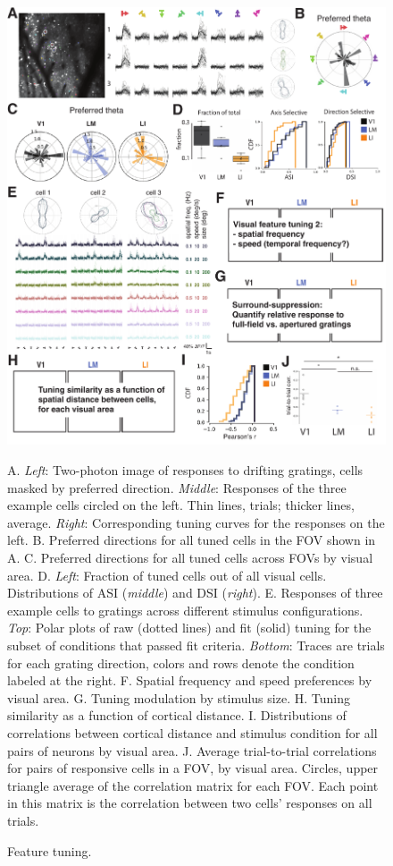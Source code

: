 \documentclass{article}
\begin{document}
\begin{figure}[ht]
  \includegraphics[width=\textwidth]{figures/features.pdf}
  \caption{Feature tuning.}
  \medskip
  \small
  A.  \textit{Left}:  Two-photon image of responses to drifting gratings, cells masked by preferred direction. \textit{Middle}: Responses of the three example cells circled on the left. Thin lines, trials; thicker lines, average. \textit{Right}:  Corresponding tuning curves for the responses on the left. 
  B.  Preferred directions for all tuned cells in the FOV shown in A.
  C.  Preferred directions for all tuned cells across FOVs by visual area.
  D.  \textit{Left}: Fraction of tuned cells out of all visual cells. Distributions of ASI (\textit{middle}) and DSI (\textit{right}).
  E.  Responses of three example cells to gratings across different stimulus configurations. \textit{Top}: Polar plots of raw (dotted lines) and fit (solid) tuning for the subset of conditions that passed fit criteria. \textit{Bottom}: Traces are trials for each grating direction, colors and rows denote the condition labeled at the right.
  F.  Spatial frequency and speed preferences by visual area.
  G.  Tuning modulation by stimulus size.
  H.  Tuning similarity as a function of cortical distance.
  I.  Distributions of correlations between cortical distance and stimulus condition for all pairs of neurons by visual area.
  J.  Average trial-to-trial correlations for pairs of responsive cells in a FOV, by visual area. Circles, upper triangle average of the correlation matrix for each FOV. Each point in this matrix is the correlation between two cells’ responses on all trials. 
  \label{fig:fig3}
\end{figure}
\end{document}
